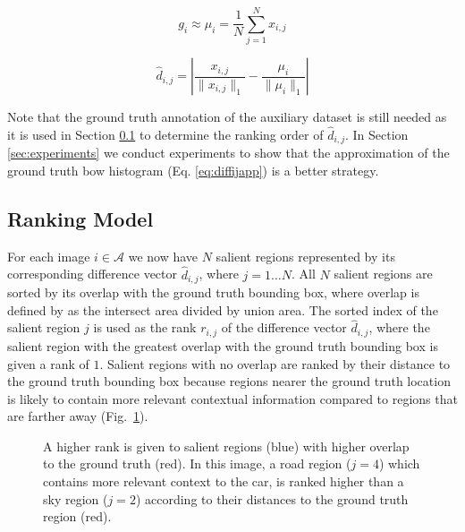 \documentclass{bmvc2k}
\def\bow{{{\sc b}o{\sc w} }}
\begin{document}
\noindent\begin{minipage}{0.5\linewidth}
\begin{equation}
g_{i} \approx \mu_{i} = \frac{1}{N} \sum_{j=1}^N x_{i,j}
\label{eq:auxapp}
\end{equation}
\end{minipage}
\begin{minipage}{0.5\linewidth}
\begin{equation}
\hat{d}_{i,j} = \left| \frac{x_{i,j}}{\| x_{i,j} \|_1} - \frac{\mu_{i}}{\| \mu_{i} \|_1 } \right|
\label{eq:diffijapp}
\end{equation}
\end{minipage}

\noindent Note that the ground truth annotation of the auxiliary dataset is still needed as it is used in Section \ref{sec:Ranking_SVM} to determine the ranking order of $\hat{d}_{i,j}$. In Section \ref{sec:experiments} we conduct experiments to show that the approximation of the ground truth \bow histogram (Eq. \ref{eq:diffijapp}) is a better strategy.


\subsection{Ranking Model}
\label{sec:Ranking_SVM}

For each image $i \in \mathcal{A}$ we now have $N$ salient regions represented by its corresponding difference vector $\hat{d}_{i,j}$, where $j=1 \ldots N$.  All $N$ salient regions are sorted by its overlap with the ground truth bounding box, where overlap is defined by \cite{pascalvoc2007} as the intersect area divided by union area. The sorted index of the salient region $j$ is used as the rank $r_{i,j}$ of the difference vector $\hat{d}_{i,j}$, where the salient region with the greatest overlap with the ground truth bounding box is given a rank of $1$. Salient regions with no overlap are ranked by their distance to the ground truth bounding box because regions nearer the ground truth location is likely to contain more relevant contextual information compared to regions that are farther away (Fig.~\ref{fig:transfer_learning}).
\begin{figure}
\begin{center}
\end{center}

\caption{A higher rank is given to salient regions (blue) with higher overlap to the ground truth (red). In this image, a road region ($j=4$) which contains more relevant context to the car, is ranked higher than a sky region ($j=2$) according to their distances to the ground truth region (red).}
\label{fig:transfer_learning}
\end{figure}
\end{document}
